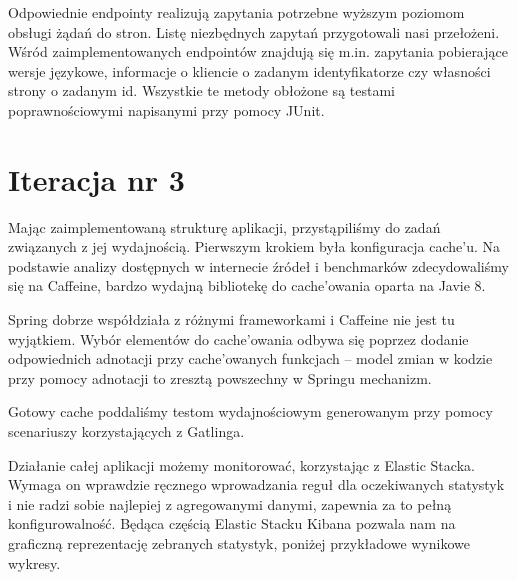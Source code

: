 \documentclass[licencjacka]{pracamgr}
\begin{document}
\vspace{1mm}

Odpowiednie endpointy realizują zapytania potrzebne wyższym poziomom obsługi żądań do stron. Listę niezbędnych zapytań przygotowali nasi przełożeni. Wśród zaimplementowanych endpointów znajdują się m.in. zapytania pobierające wersje językowe, informacje o kliencie o zadanym identyfikatorze czy własności strony o zadanym id. Wszystkie te metody obłożone są testami poprawnościowymi napisanymi przy pomocy JUnit.

\section{Iteracja nr 3}

Mając zaimplementowaną strukturę aplikacji, przystąpiliśmy do zadań związanych z jej wydajnością. Pierwszym krokiem była konfiguracja cache’u. Na podstawie analizy dostępnych w internecie źródeł i benchmarków zdecydowaliśmy się na Caffeine, bardzo wydajną bibliotekę do cache’owania oparta na Javie 8.

\vspace{1mm}

Spring dobrze współdziała z różnymi frameworkami i Caffeine nie jest tu wyjątkiem. Wybór elementów do cache’owania odbywa się poprzez dodanie odpowiednich adnotacji przy cache’owanych funkcjach – model zmian w kodzie przy pomocy adnotacji to zresztą powszechny w Springu mechanizm.

\vspace{1mm}

Gotowy cache poddaliśmy testom wydajnościowym generowanym przy pomocy scenariuszy korzystających z Gatlinga.

\vspace{1mm}

Działanie całej aplikacji możemy monitorować, korzystając z Elastic Stacka. Wymaga on wprawdzie ręcznego wprowadzania reguł dla oczekiwanych statystyk i nie radzi sobie najlepiej z agregowanymi danymi, zapewnia za to pełną konfigurowalność. Będąca częścią Elastic Stacku Kibana pozwala nam na graficzną reprezentację zebranych statystyk, poniżej przykładowe wynikowe wykresy.

\vspace{15mm}
\end{document}
